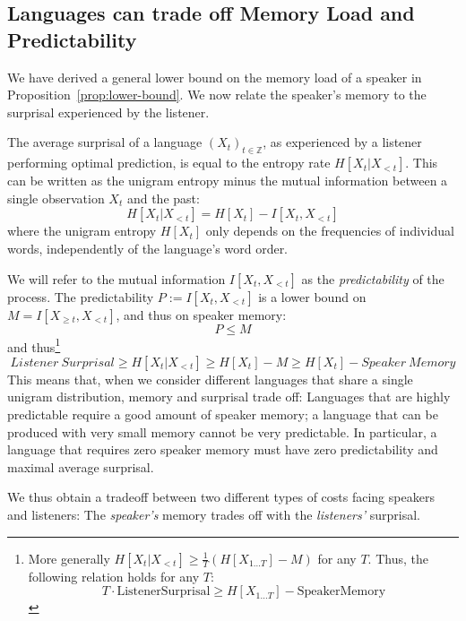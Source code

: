 \documentclass[11pt,letterpaper]{article}
\begin{document}
\subsection{Languages can trade off Memory Load and Predictability}

We have derived a general lower bound on the memory load of a speaker in Proposition~\ref{prop:lower-bound}.
We now relate the speaker's memory to the surprisal experienced by the listener.

The average surprisal of a language $(X_t)_{t \in \mathbb{Z}}$, as experienced by a listener performing optimal prediction, is equal to the entropy rate $H[X_t|X_{<t}]$.
This can be written as the unigram entropy minus the mutual information between a single observation $X_t$ and the past:
\begin{equation}
	H[X_t|X_{<t}] = H[X_t] - I[X_t, X_{<t}]
\end{equation}
where the unigram entropy $H[X_t]$ only depends on the frequencies of individual words, independently of the language's word order.

We will refer to the mutual information $I[X_t, X_{<t}]$ as the \emph{predictability} of the process.
The predictability $P := I[X_t, X_{<t}]$ is a lower bound on $M = I[X_{\geq t}, X_{<t}]$, and thus on speaker memory:
\begin{equation}
P \leq M
\end{equation}
and thus\footnote{More generally 
$H[X_t|X_{<t}] \geq \frac{1}{T} \left(H[X_{1\dots T}] - M\right)$ for any $T$. Thus, the following relation holds for any $T$: $$T \cdot \text{ListenerSurprisal} \geq H[X_{1\dots T}] - \text{SpeakerMemory}$$}
\begin{equation}
	Listener\ Surprisal \geq	H[X_t|X_{<t}] \geq H[X_t] - M \geq H[X_t] - Speaker\ Memory
\end{equation}
This means that, when we consider different languages that share a single unigram distribution, memory and surprisal trade off:
Languages that are highly predictable  require a good amount of speaker memory; a language that can be produced with very small memory cannot be very predictable.
In particular, a language that requires zero speaker memory must have zero predictability and maximal average surprisal.

We thus obtain a tradeoff between two different types of costs facing speakers and listeners: The \emph{speaker's} memory trades off with the \emph{listeners'} surprisal.
\end{document}
